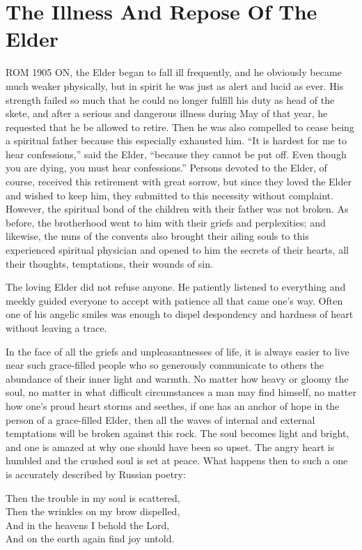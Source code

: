 \chapter{The Illness And Repose Of The Elder}
ROM 1905 ON, the Elder began to fall ill frequently, and he obviously became much weaker physically, but in spirit he was just as alert and lucid as ever. His strength failed so much that he could no longer fulfill his duty as head of the skete, and after a serious and dangerous illness during May of that year, he requested that he be allowed to retire. Then he was also compelled to cease being a spiritual father because this especially exhausted him. ``It is hardest for me to hear confessions,'' said the Elder, ``because they cannot be put off. Even though you are dying, you must hear confessions.'' Persons devoted to the Elder, of course, received this retirement with great sorrow, but since they loved the Elder and wished to keep him, they submitted to this necessity without complaint. However, the spiritual bond of the children with their father was not broken. As before, the brotherhood went to him with their griefs and perplexities; and likewise, the nuns of the convents also brought their ailing souls to this experienced spiritual physician and opened to him the secrets of their hearts, all their thoughts, temptations, their wounds of sin.

The loving Elder did not refuse anyone. He patiently listened to everything and meekly guided everyone to accept with patience all that came one's way. Often one of his angelic smiles was enough to dispel despondency and hardness of heart without leaving a trace.

In the face of all the griefs and unpleasantnesses of life, it is always easier to live near such grace-filled people who so generously communicate to others the abundance of their inner light and warmth. No matter how heavy or gloomy the soul, no matter in what difficult circumstances a man may find himself, no matter how one's proud heart storms and seethes, if one has an anchor of hope in the person of a grace-filled Elder, then all the waves of internal and external temptations will be broken against this rock. The soul becomes light and bright, and one is amazed at why one should have been so upset. The angry heart is humbled and the crushed soul is set at peace. What happens then to such a one is accurately described by Russian poetry:

\begin{adjustwidth}{1.5cm}{1.5cm}
\center
\vspace*{.5cm}
Then the trouble in my soul is scattered,\\Then the wrinkles on my brow dispelled,\\And in the heavens I behold the Lord,\\And on the earth again find joy untold.
\vspace*{.5cm}
\end{adjustwidth}

